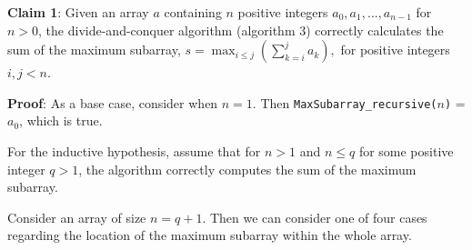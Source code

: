 \documentclass[a4paper,10pt]{article}
\begin{document}
% 
% 
% 
% 
% 


		{\bf Claim 1}: Given an array $a$ containing $n$ positive integers $a_0, a_1, \dots, a_{n-1}$ for $n > 0$, the divide-and-conquer algorithm (algorithm 3) correctly calculates the sum of the maximum subarray, $\displaystyle s = \max_{i\leq{j}} \left(\sum_{k=i}^j a_k\right),$ for positive integers $i,j<n$.

		{\bf Proof}: As a base case, consider when $n=1$. Then {\tt MaxSubarray\_recursive($n$)} = $a_0$, which is true.

		For the inductive hypothesis, assume that for $n > 1$ and $n \leq q$ for some positive integer $q>1$, the algorithm correctly computes the sum of the maximum subarray.

		Consider an array of size $n=q+1$. Then we can consider one of four cases regarding the location of the maximum subarray within the whole array.
\end{document}
